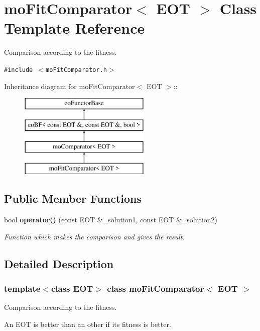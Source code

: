 \section{mo\-Fit\-Comparator$<$ EOT $>$ Class Template Reference}
\label{classmo_fit_comparator}
Comparison according to the fitness.  


{\tt \#include $<$mo\-Fit\-Comparator.h$>$}

Inheritance diagram for mo\-Fit\-Comparator$<$ EOT $>$::\begin{figure}[H]
\begin{center}
\leavevmode
\includegraphics[height=4cm]{classmo_fit_comparator}
\end{center}
\end{figure}
\subsection*{Public Member Functions}
\begin{CompactItemize}
\item 
bool {\bf operator()} (const EOT \&\_\-solution1, const EOT \&\_\-solution2)
\begin{CompactList}\small\item\em Function which makes the comparison and gives the result. \item\end{CompactList}\end{CompactItemize}


\subsection{Detailed Description}
\subsubsection*{template$<$class EOT$>$ class mo\-Fit\-Comparator$<$ EOT $>$}

Comparison according to the fitness. 

An EOT is better than an other if its fitness is better. 




